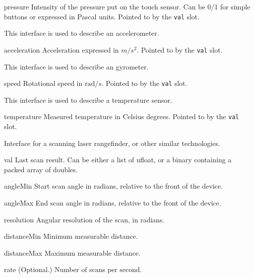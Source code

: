 \begin{urbiscriptapi}
\item[pressure] Intensity of the pressure put on the touch sensor. Can be
  0/1 for simple buttons or expressed in Pascal units. Pointed to by the
  \lstinline{val} slot.
\end{urbiscriptapi}



This interface is used to describe an accelerometer.

\begin{urbiscriptapi}
\item[acceleration] Acceleration expressed in $m/s^2$.  Pointed to by the
  \lstinline{val} slot.
\end{urbiscriptapi}

This interface is used to describe an gyrometer.

\begin{urbiscriptapi}
\item[speed] Rotational speed in $\mathrm{rad}/s$.  Pointed to by the
  \lstinline{val} slot.
\end{urbiscriptapi}

This interface is used to describe a temperature sensor.

\begin{urbiscriptapi}
\item[temperature] Measured temperature in Celsius degrees.  Pointed to by
  the \lstinline{val} slot.
\end{urbiscriptapi}

Interface for a scanning laser rangefinder, or other similar technologies.

\begin{urbiscriptapi}
\item[val] Last scan result. Can be either a list of ufloat, or a binary
  containing a packed array of doubles.

\item[angleMin] Start scan angle in radians, relative to the front of the
  device.

\item[angleMax] End scan angle in radians, relative to the front of the
  device.

\item[resolution] Angular resolution of the scan, in radians.

\item[distanceMin] Minimum measurable distance.

\item[distanceMax] Maximum measurable distance.

\item[rate] (Optional.) Number of scans per second.
\end{urbiscriptapi}

